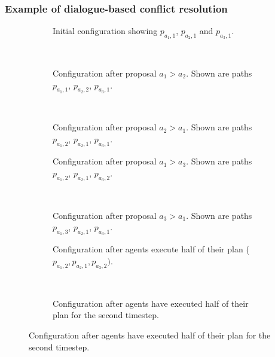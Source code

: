 \subsubsection{Example of dialogue-based conflict resolution}
\begin{figure}
    \centering
    \begin{subfigure}[t]{.3\textwidth}
        \centering
        \def\svgscale{.6}
        
        \caption{Initial configuration showing $p_{a_1,1}$, $p_{a_2,1}$ and 
            $p_{a_3,1}$.}
        \label{fig:wdpca-example1}
    \end{subfigure}
    ~
    \begin{subfigure}[t]{.3\textwidth}
        \centering
        \def\svgscale{.6}
        
        \caption{Configuration after proposal $a_1 > a_2$. Shown are paths 
            $p_{a_1,1}$, $p_{a_2,2}$, $p_{a_3,1}$.}
        \label{fig:wdpca-example2}
    \end{subfigure}
    ~
    \begin{subfigure}[t]{.3\textwidth}
        \centering
        \def\svgscale{.6}
        
        \caption{Configuration after proposal $a_2 > a_1$. Shown are paths 
            $p_{a_1,2}$, $p_{a_2,1}$, $p_{a_3,1}$.}
        \label{fig:wdpca-example3}
    \end{subfigure}
    
    \begin{subfigure}[t]{.4\textwidth}
        \centering
        \def\svgscale{.6}
        
        \caption{Configuration after proposal $a_1 > a_3$. Shown are paths 
            $p_{a_1,2}$, $p_{a_2,1}$, $p_{a_3,2}$.}
        \label{fig:wdpca-example4}
    \end{subfigure}
    ~
    \begin{subfigure}[t]{.4\textwidth}
        \centering
        \def\svgscale{.6}
        
        \caption{Configuration after proposal $a_3 > a_1$. Shown are paths 
            $p_{a_1,3}$, $p_{a_2,1}$, $p_{a_3,1}$.}
        \label{fig:wdpca-example5}
    \end{subfigure}

    \begin{subfigure}[t]{.4\textwidth}
        \centering
        \def\svgscale{.6}
        
        \caption{Configuration after agents execute half of their plan 
        ($p_{a_1,2}, p_{a_2,1}, p_{a_3,2})$.}
        \label{fig:wdpca-example6}
    \end{subfigure}
    ~
    \begin{subfigure}[t]{.4\textwidth}
        \centering
        \def\svgscale{.6}
        
        \caption{Configuration after agents have executed half of their plan 
        for the second timestep.}
        \label{fig:wdpca-example7}
    \end{subfigure}
    

\end{figure}
